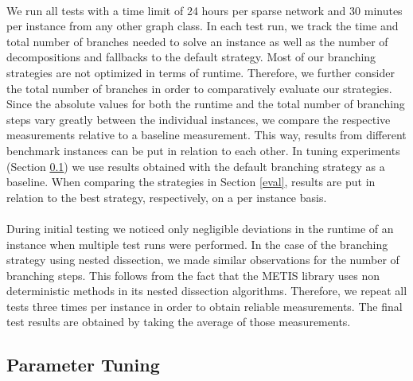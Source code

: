 \documentclass[12pt,a4paper,twoside]{scrartcl}
\numberwithin{equation}{section}
\begin{document}
\paragraph{}
We run all tests with a time limit of 24 hours per sparse network and 30 minutes per instance from any other graph class. In each test run, we track the time and total number of branches needed to solve an instance as well as the number of decompositions and fallbacks to the default strategy. Most of our branching strategies are not optimized in terms of runtime. Therefore, we further consider the total number of branches in order to comparatively evaluate our strategies. Since the absolute values for both the runtime and the total number of branching steps vary greatly between the individual instances, we compare the respective measurements relative to a baseline measurement. This way, results from different benchmark instances can be put in relation to each other. In tuning experiments (Section \ref{tune}) we use results obtained with the default branching strategy as a baseline. When comparing the strategies in Section \ref{eval}, results are put in relation to the best strategy, respectively, on a per instance basis.

\paragraph{}
During initial testing we noticed only negligible deviations in the runtime of an instance when multiple test runs were performed. In the case of the branching strategy using nested dissection, we made similar observations for the number of branching steps. This follows from the fact that the METIS library uses non deterministic methods in its nested dissection algorithms. Therefore, we repeat all tests three times per instance in order to obtain reliable measurements. The final test results are obtained by taking the average of those measurements.

\subsection{Parameter Tuning}\label{tune}
\end{document}
